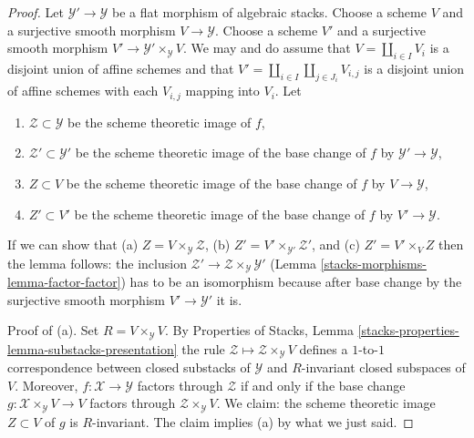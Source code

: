 \begin{proof}
Let $\mathcal{Y}' \to \mathcal{Y}$ be a flat morphism of algebraic stacks.
Choose a scheme $V$ and a surjective smooth morphism $V \to \mathcal{Y}$.
Choose a scheme $V'$ and a
surjective smooth morphism $V' \to \mathcal{Y}' \times_\mathcal{Y} V$.
We may and do assume that $V = \coprod_{i \in I} V_i$ is a disjoint
union of affine schemes and that
$V' = \coprod_{i \in I} \coprod_{j \in J_i} V_{i, j}$
is a disjoint union of affine schemes with each $V_{i, j}$ mapping into $V_i$.
Let
\begin{enumerate}
\item $\mathcal{Z} \subset \mathcal{Y}$ be the scheme theoretic image of $f$,
\item $\mathcal{Z}' \subset \mathcal{Y}'$ be the scheme theoretic image
of the base change of $f$ by $\mathcal{Y}' \to \mathcal{Y}$,
\item $Z \subset V$ be the scheme theoretic image
of the base change of $f$ by $V \to \mathcal{Y}$,
\item $Z' \subset V'$ be the scheme theoretic image
of the base change of $f$ by $V' \to \mathcal{Y}$.
\end{enumerate}
If we can show that
(a) $Z = V \times_\mathcal{Y} \mathcal{Z}$,
(b) $Z' = V' \times_{\mathcal{Y}'} \mathcal{Z}'$, and
(c) $Z' = V' \times_V Z$
then the lemma follows: the inclusion
$\mathcal{Z}' \to \mathcal{Z} \times_\mathcal{Y} \mathcal{Y}'$
(Lemma \ref{stacks-morphisms-lemma-factor-factor})
has to be an isomorphism because after base change by the surjective
smooth morphism $V' \to \mathcal{Y}'$ it is.

\medskip\noindent
Proof of (a). Set $R = V \times_\mathcal{Y} V$.
By Properties of Stacks, Lemma
\ref{stacks-properties-lemma-substacks-presentation}
the rule $\mathcal{Z} \mapsto \mathcal{Z} \times_\mathcal{Y} V$
defines a $1$-to-$1$ correspondence between closed substacks
of $\mathcal{Y}$ and $R$-invariant closed subspaces of $V$.
Moreover, $f : \mathcal{X} \to \mathcal{Y}$ factors through $\mathcal{Z}$
if and only if the base change
$g : \mathcal{X} \times_\mathcal{Y} V \to V$ factors through
$\mathcal{Z} \times_\mathcal{Y} V$.
We claim: the scheme theoretic image $Z \subset V$ of $g$
is $R$-invariant. The claim implies (a) by what we just said.


\end{proof}
